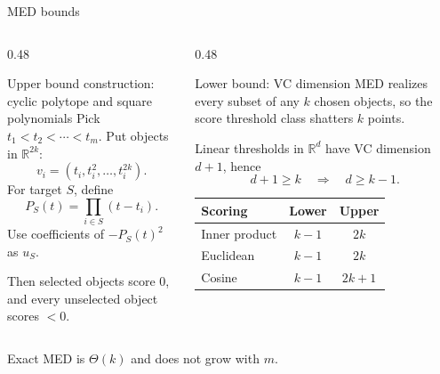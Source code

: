 \documentclass[aspectratio=169,11pt]{beamer}
\newcommand{\R}{\mathbb{R}}
\begin{document}
\begin{frame}{MED bounds}
  \begin{columns}[T,onlytextwidth]
    \begin{column}{0.48\textwidth}
      \begin{block}{Upper bound construction: \\cyclic polytope and square polynomials}
        Pick $t_1<t_2 <\cdots < t_m$. Put objects in $\R^{2k}$:
        \[
          v_i=(t_i,t_i^2,\ldots,t_i^{2k}).
        \]
        For target $S$, define
        \[
          P_S(t)=\prod_{i\in S}(t-t_i).
        \]
        Use coefficients of $-P_S(t)^2$ as $u_S$.

        \vspace{0.2em}
        Then selected objects score $0$, and every unselected object
        scores $<0$.
      \end{block}
    \end{column}
    \begin{column}{0.48\textwidth}
      \begin{block}{Lower bound: VC dimension}
        MED realizes every subset of any $k$ chosen objects, so the score
        threshold class shatters $k$ points.

        \vspace{0.3em}
        Linear thresholds in $\R^d$ have VC dimension $d+1$, hence
        \[
          d+1\ge k\quad\Rightarrow\quad d\ge k-1.
        \]
      \end{block}

      \vspace{0.2em}
      \centering
      \small
      \begin{tabular}{lcc}
        \toprule
        Scoring & Lower & Upper \\
        \midrule
        Inner product & $k-1$ & $2k$ \\
        Euclidean & $k-1$ & $2k$ \\
        Cosine & $k-1$ & $2k+1$ \\
        \bottomrule
      \end{tabular}
    \end{column}
  \end{columns}

  \vspace{0.5em}
  \centering
  \large Exact MED is $\Theta(k)$ and does not grow with $m$.
\end{frame}
\end{document}
